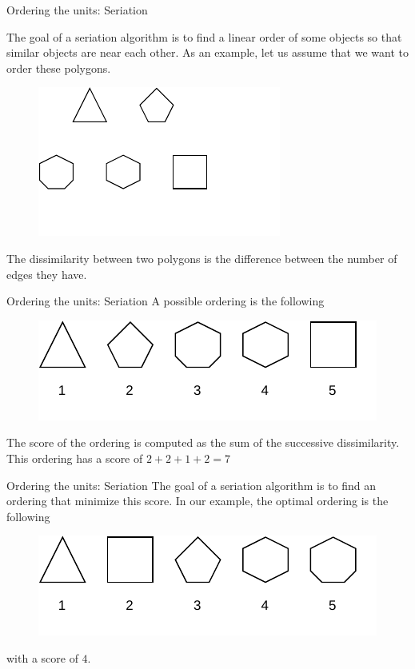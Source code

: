 \documentclass[10pt]{beamer}
\begin{document}
\begin{frame}{Ordering the units: Seriation}

    The goal of a seriation algorithm is to find a linear order of some objects so that similar objects are near each other.
    As an example, let us assume that we want to order these polygons.

    \begin{figure}
        \centering
        \includegraphics{figures/seriation-objects.pdf}
    \end{figure}

    The dissimilarity between two polygons is the difference between the number of edges they have.
\end{frame}

\begin{frame}{Ordering the units: Seriation}
    A possible ordering is the following

    \begin{figure}
        \centering
        \includegraphics{figures/seriation-order-1.pdf}
    \end{figure}

    The score of the ordering is computed as the sum of the successive dissimilarity.
    This ordering has a score of $2 + 2 + 1 + 2 = 7$
\end{frame}

\begin{frame}{Ordering the units: Seriation}
    The goal of a seriation algorithm is to find an ordering that minimize this score. In our example, the optimal ordering is the following
    \begin{figure}
        \centering
        \includegraphics{figures/seriation-order-2.pdf}
    \end{figure}
    with a score of $4$.
\end{frame}
\end{document}
